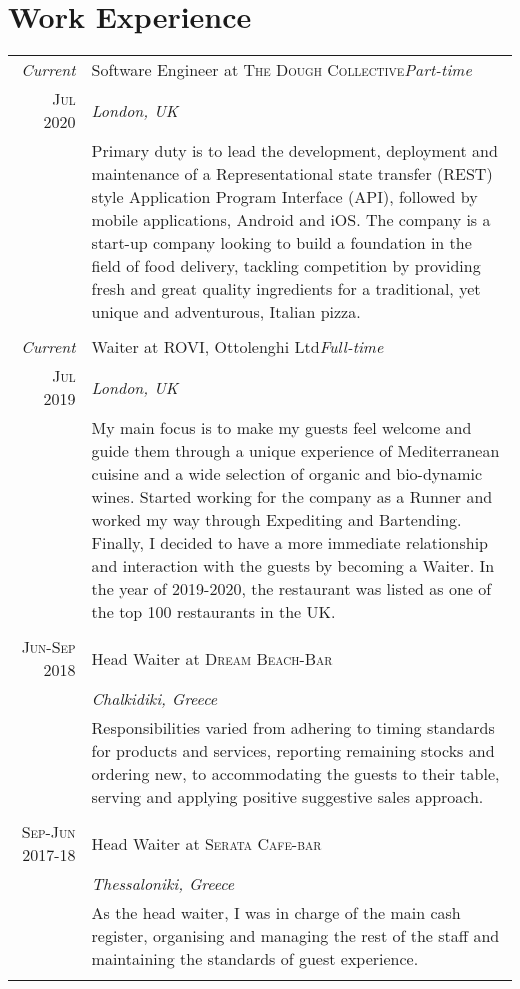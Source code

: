 \documentclass[a4paper,10pt]{article}
\begin{document}
\section{Work Experience}
\begin{tabular}{r|p{11cm}}
\emph{Current} & Software Engineer at \textsc{The Dough Collective}\hfill\textit{Part-time} \\\textsc{Jul 2020} &\emph{London, UK} \\&\footnotesize{Primary duty is to lead the development, deployment and maintenance of a Representational state transfer (REST) style Application Program Interface (API), followed by mobile applications, Android and iOS. The company is a start-up company looking to build a foundation in the field of food delivery, tackling competition by providing fresh and great quality ingredients for a traditional, yet unique and adventurous, Italian pizza.} \\\multicolumn{2}{c}{} \\
\emph{Current} & Waiter at \textsc{ROVI}, Ottolenghi Ltd\hfill \textit{Full-time} \\\textsc{Jul 2019} &\emph{London, UK}\\&\footnotesize{My main focus is to make my guests feel welcome and guide them through a unique experience of Mediterranean cuisine and a wide selection of organic and bio-dynamic wines. Started working for the company as a Runner and worked my way through Expediting and Bartending. Finally, I decided to have a more immediate relationship and interaction with the guests by becoming a Waiter. In the year of 2019-2020, the restaurant was listed as one of the top 100 restaurants in the UK.}\\\multicolumn{2}{c}{} \\
\textsc{Jun-Sep 2018} & Head Waiter at \textsc{Dream Beach-Bar} \\&\emph{Chalkidiki, Greece}\\&\footnotesize{Responsibilities varied from adhering to timing standards for products and services, reporting remaining stocks and ordering new, to accommodating the guests to their table, serving and applying positive suggestive sales approach.}\\\multicolumn{2}{c}{} \\
\textsc{Sep-Jun 2017-18} & Head Waiter at \textsc{Serata Cafe-bar} \\&\emph{Thessaloniki, Greece}\\&\footnotesize{As the head waiter, I was in charge of the main cash register, organising and managing the rest of the staff and maintaining the standards of guest experience.}\\\multicolumn{2}{c}{} \\

\end{tabular}
\end{document}
